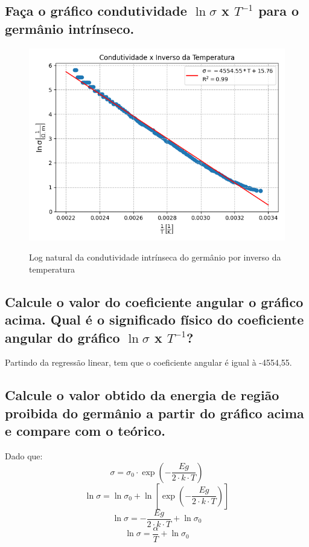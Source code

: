 \subsection{Faça o gráfico condutividade \texorpdfstring{$\ln \sigma$ x $T^{-1}$}{} para o germânio intrínseco.}
\begin{figure}[H]   
        \centering
        \includegraphics[width = \textwidth]{Figure_2.png}\label{fig2}
        \caption{Log natural da condutividade intrínseca do germânio por inverso da temperatura}
    \end{figure}


\subsection{Calcule o valor do coeficiente angular o gráfico acima. Qual é o significado físico do coeficiente angular do gráfico \texorpdfstring{$\ln \sigma$ x $T^{-1}$?}{}}
Partindo da regressão linear, tem que o coeficiente angular é igual à -4554,55.


\subsection{Calcule o valor obtido da energia de região proibida do germânio a partir do gráfico acima e compare com o teórico.}
Dado que:
\begin{equation} \sigma = \sigma_{0}\cdot\exp\left({-\frac{Eg}{2\cdot k \cdot T}}\right)
\label{eq8}\end{equation}
\begin{equation} \ln\sigma = \ln\sigma_{0} + \ln\left[\exp\left({-\frac{Eg}{2\cdot k \cdot T}}\right)\right] \label{eq9}\end{equation}
\begin{equation} \ln\sigma = -\frac{Eg}{2\cdot k \cdot T} + \ln\sigma_{0} \label{eq10}\end{equation}
\begin{equation} \ln\sigma = \frac{\alpha}{T} + \ln\sigma_{0} \label{eq11}\end{equation}

